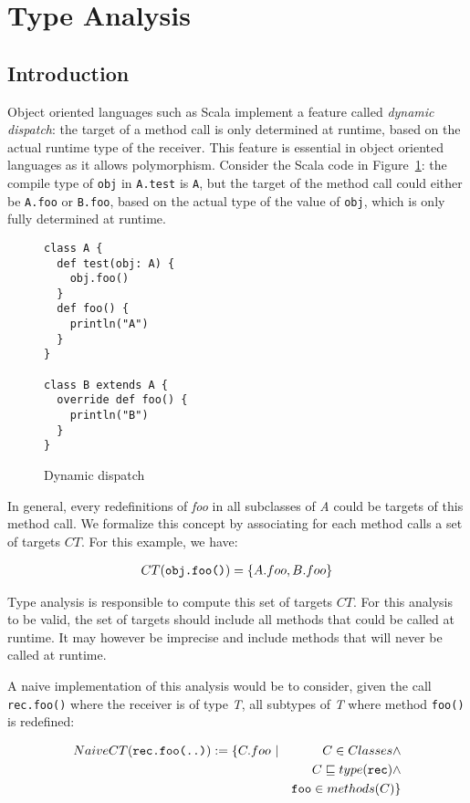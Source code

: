 \section{Type Analysis}

\subsection{Introduction}
Object oriented languages such as Scala implement a feature called
\emph{dynamic dispatch}: the target of a method call is only determined at
runtime, based on the actual runtime type of the receiver. This feature is
essential in object oriented languages as it allows polymorphism. Consider the
Scala code in Figure~\ref{fig:ta:example1}: the compile type of \verb/obj/ in
\verb/A.test/ is \verb/A/, but the target of the method call could either be
\verb/A.foo/ or \verb/B.foo/, based on the actual type of the value of
\verb/obj/, which is only fully determined at runtime.

\begin{figure}[h]
    \centering
\begin{lstlisting}
class A {
  def test(obj: A) {
    obj.foo()
  }
  def foo() {
    println("A")
  }
}

class B extends A {
  override def foo() {
    println("B")
  }
}
\end{lstlisting}
    \caption{Dynamic dispatch}
    \label{fig:ta:example1}
\end{figure}

In general, every redefinitions of \emph{foo} in all subclasses of \emph{A}
could be targets of this method call. We formalize this concept by associating
for each method calls a set of targets $CT$. For this example, we have:

\begin{eqnarray*}
    CT(\verb/obj.foo()/) = \{A.foo, B.foo\}
\end{eqnarray*}

Type analysis is responsible to compute this set of targets $CT$. For this
analysis to be valid, the set of targets should include all methods that could
be called at runtime. It may however be imprecise and include methods that will
never be called at runtime.

A naive implementation of this analysis would be to consider, given the call
\verb/rec.foo()/ where the receiver is of type \emph{T}, all subtypes of
\emph{T} where method \verb/foo()/ is redefined:

\begin{eqnarray*}
        NaiveCT(\verb/rec.foo(..)/) := \{C.foo ~ &|& C \in Classes \land \\
        && C \subtype type(\verb/rec/) \land \\
        && \verb/foo/ \in methods(C) \}
\end{eqnarray*}

